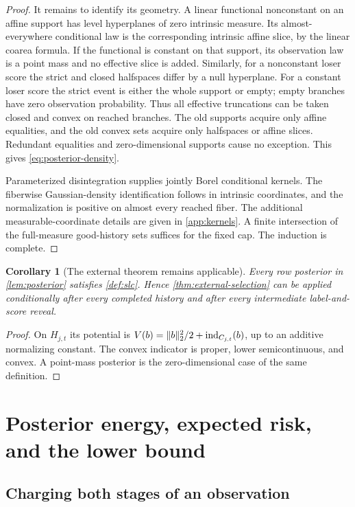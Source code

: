 \documentclass[11pt]{article}
\numberwithin{equation}{section}
\newtheorem{corollary}[corollary]{Corollary}
\theoremstyle{definition}
\theoremstyle{remark}
\DeclareMathOperator{\ind}{ind}
\DeclarePairedDelimiter{\norm}{\lVert}{\rVert}
\begin{document}
\begin{proof}
It remains to identify its geometry. A linear functional nonconstant on an affine support has level hyperplanes of zero intrinsic measure. Its almost-everywhere conditional law is the corresponding intrinsic affine slice, by the linear coarea formula. If the functional is constant on that support, its observation law is a point mass and no effective slice is added. Similarly, for a nonconstant loser score the strict and closed halfspaces differ by a null hyperplane. For a constant loser score the strict event is either the whole support or empty; empty branches have zero observation probability. Thus all effective truncations can be taken closed and convex on reached branches. The old supports acquire only affine equalities, and the old convex sets acquire only halfspaces or affine slices. Redundant equalities and zero-dimensional supports cause no exception. This gives \eqref{eq:posterior-density}.

Parameterized disintegration supplies jointly Borel conditional kernels. The fiberwise Gaussian-density identification follows in intrinsic coordinates, and the normalization is positive on almost every reached fiber. The additional measurable-coordinate details are given in \cref{app:kernels}. A finite intersection of the full-measure good-history sets suffices for the fixed cap. The induction is complete.
\end{proof}

\begin{corollary}[The external theorem remains applicable]\label{cor:posterior-slc}
Every row posterior in \cref{lem:posterior} satisfies \cref{def:slc}. Hence \cref{thm:external-selection} can be applied conditionally after every completed history and after every intermediate label-and-score reveal.
\end{corollary}
\begin{proof}
On $H_{j,t}$ its potential is $V(b)=\norm{b}_2^2/2+\ind_{C_{j,t}}(b)$, up to an additive normalizing constant. The convex indicator is proper, lower semicontinuous, and convex. A point-mass posterior is the zero-dimensional case of the same definition.
\end{proof}

\section{Posterior energy, expected risk, and the lower bound}\label{sec:lower}

\subsection{Charging both stages of an observation}
\end{document}
